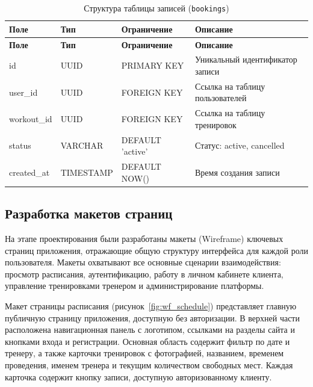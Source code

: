 \begin{longtable}{|l|l|p{3.5cm}|p{5.5cm}|}
    \caption{Структура таблицы записей (\texttt{bookings})} \label{tab:db_bookings} \\

    \hline
    \textbf{Поле} & \textbf{Тип} & \textbf{Ограничение} & \textbf{Описание} \\ \hline
    \endfirsthead

    \tabcont{\ref{tab:db_bookings}}
    \textbf{Поле} & \textbf{Тип} & \textbf{Ограничение} & \textbf{Описание} \\ \hline
    \endhead

    \hline
    \endfoot

    \hline
    \endlastfoot

    id          & UUID      & PRIMARY KEY      & Уникальный идентификатор записи       \\ \hline
    user\_id    & UUID      & FOREIGN KEY      & Ссылка на таблицу пользователей       \\ \hline
    workout\_id & UUID      & FOREIGN KEY      & Ссылка на таблицу тренировок          \\ \hline
    status      & VARCHAR   & DEFAULT 'active' & Статус: active, cancelled             \\ \hline
    created\_at & TIMESTAMP & DEFAULT NOW()    & Время создания записи                 \\ \hline
\end{longtable}
\clearpage
\subsection{Разработка макетов страниц}

На этапе проектирования были разработаны макеты (Wireframe) ключевых страниц приложения, отражающие общую структуру интерфейса для каждой роли пользователя. Макеты охватывают все основные сценарии взаимодействия: просмотр расписания, аутентификацию, работу в личном кабинете клиента, управление тренировками тренером и администрирование платформы.

Макет страницы расписания (рисунок~\ref{fig:wf_schedule}) представляет главную публичную страницу приложения, доступную без авторизации. В верхней части расположена навигационная панель с логотипом, ссылками на разделы сайта и кнопками входа и регистрации. Основная область содержит фильтр по дате и тренеру, а также карточки тренировок с фотографией, названием, временем проведения, именем тренера и текущим количеством свободных мест. Каждая карточка содержит кнопку записи, доступную авторизованному клиенту.

